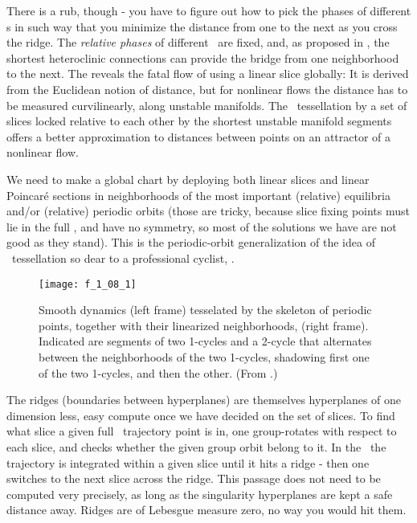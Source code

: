 There is a rub, though - you have to figure out how to pick the phases of
different {\template s} in such way that you minimize the distance from
one to the next as you cross the ridge. The {\em relative phases} of
different \reqva\ are fixed, and, as proposed in , the
shortest heteroclinic connections can provide the bridge from one
neighborhood to the next. The reveals the fatal flow of using a linear
slice globally: It is derived from the Euclidean notion of distance, but
for nonlinear flows the distance has to be measured curvilinearly, along
unstable manifolds. The \reducedsp\
tessellation by a set of slices locked relative to each other by the
shortest unstable manifold segments offers a better approximation to
distances between points on an attractor of a nonlinear flow.

We need to make a global chart by deploying both linear slices and linear
Poincar\'e sections in neighborhoods of the most important (relative)
equilibria and/or (relative) periodic orbits (those are tricky, because
slice fixing points must lie in the full \statesp, and have no symmetry,
so most of the solutions we have are not good as they stand). This is the
periodic-orbit generalization of the idea of
{\statesp\ tessellation}
so dear to a professional cyclist, .

 \begin{figure}
 \begin{center}
\texttt{[image: f\_1\_08\_1]}
 \end{center}
 \caption{\label{fig:Tesselate}
Smooth dynamics  (left frame) tesselated by the skeleton of
periodic points, together with their linearized neighborhoods,
(right frame).
Indicated are segments of two 1-cycles and a 2-cycle that
alternates between the neighborhoods of the two 1-cycles,
shadowing first one of the two 1-cycles, and then the other.
(From \wwwcb{}.)
  }\end{figure}
%


The ridges (boundaries
between hyperplanes) are themselves hyperplanes of one dimension less,
easy compute once we have decided on the set of slices. To find
what slice a given full \statesp\ trajectory point is in, one group-rotates
with respect to each slice, and checks whether the given group orbit
belong to it. In the \reducedsp\ the trajectory is integrated within a
given slice until it hits a ridge - then one switches to
the next slice across the ridge. This passage does not need to
be computed very precisely, as long as the singularity
hyperplanes are kept a safe distance away. Ridges are of Lebesgue
measure zero, no
way you would hit them.

